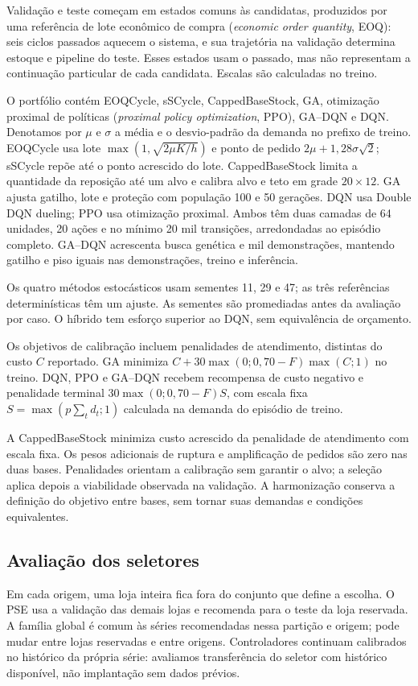 \documentclass[preprint,12pt]{elsarticle}
\begin{document}
Validação e teste começam em estados comuns às candidatas, produzidos por uma referência de lote econômico de compra (\textit{economic order quantity}, EOQ): seis ciclos passados aquecem o sistema, e sua trajetória na validação determina estoque e pipeline do teste. Esses estados usam o passado, mas não representam a continuação particular de cada candidata. Escalas são calculadas no treino.

O portfólio contém EOQCycle, sSCycle, CappedBaseStock, GA, otimização proximal de políticas (\textit{proximal policy optimization}, PPO), GA--DQN e DQN. Denotamos por $\mu$ e $\sigma$ a média e o desvio-padrão da demanda no prefixo de treino. EOQCycle usa lote $\max(1,\sqrt{2\mu K/h})$ e ponto de pedido $2\mu+1{,}28\sigma\sqrt2$; sSCycle repõe até o ponto acrescido do lote. CappedBaseStock limita a quantidade da reposição até um alvo e calibra alvo e teto em grade $20\times12$. GA ajusta gatilho, lote e proteção com população 100 e 50 gerações. DQN usa Double DQN dueling; PPO usa otimização proximal. Ambos têm duas camadas de 64 unidades, 20 ações e no mínimo 20 mil transições, arredondadas ao episódio completo. GA--DQN acrescenta busca genética e mil demonstrações, mantendo gatilho e piso iguais nas demonstrações, treino e inferência.

Os quatro métodos estocásticos usam sementes 11, 29 e 47; as três referências determinísticas têm um ajuste. As sementes são promediadas antes da avaliação por caso. O híbrido tem esforço superior ao DQN, sem equivalência de orçamento.

Os objetivos de calibração incluem penalidades de atendimento, distintas do custo $C$ reportado. GA minimiza $C+30\max(0;0{,}70-F)\max(C;1)$ no treino. DQN, PPO e GA--DQN recebem recompensa de custo negativo e penalidade terminal $30\max(0;0{,}70-F)S$, com escala fixa $S=\max(p\sum_t d_t;1)$ calculada na demanda do episódio de treino.

A CappedBaseStock minimiza custo acrescido da penalidade de atendimento com escala fixa. Os pesos adicionais de ruptura e amplificação de pedidos são zero nas duas bases. Penalidades orientam a calibração sem garantir o alvo; a seleção aplica depois a viabilidade observada na validação. A harmonização conserva a definição do objetivo entre bases, sem tornar suas demandas e condições equivalentes.

\subsection{Avaliação dos seletores}
Em cada origem, uma loja inteira fica fora do conjunto que define a escolha. O PSE usa a validação das demais lojas e recomenda para o teste da loja reservada. A família global é comum às séries recomendadas nessa partição e origem; pode mudar entre lojas reservadas e entre origens. Controladores continuam calibrados no histórico da própria série: avaliamos transferência do seletor com histórico disponível, não implantação sem dados prévios.
\end{document}
